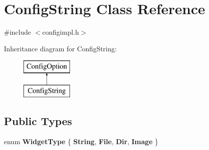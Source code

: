 \hypertarget{class_config_string}{}\section{Config\+String Class Reference}
\label{class_config_string}


{\ttfamily \#include $<$configimpl.\+h$>$}

Inheritance diagram for Config\+String\+:\begin{figure}[H]
\begin{center}
\leavevmode
\includegraphics[height=2.000000cm]{class_config_string}
\end{center}
\end{figure}
\subsection*{Public Types}
\begin{DoxyCompactItemize}
\item 
\mbox{\label{class_config_string_a6d65e61d6dcbd73f014d16ef4b7721d1}} 
enum {\bfseries Widget\+Type} \{ {\bfseries String}, 
{\bfseries File}, 
{\bfseries Dir}, 
{\bfseries Image}
 \}
\end{DoxyCompactItemize}
